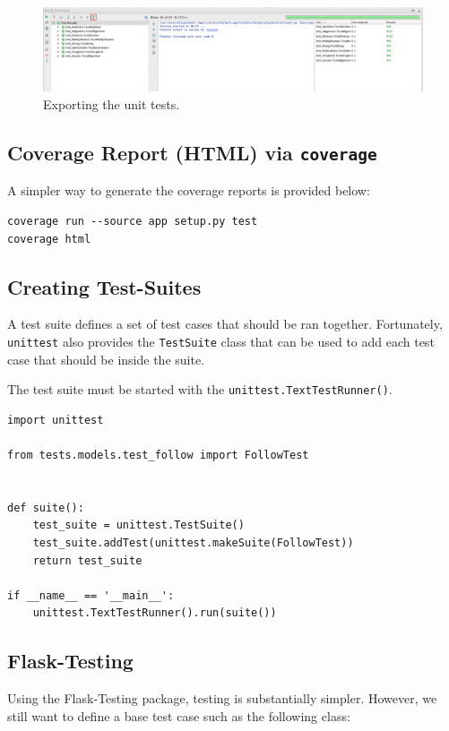 \documentclass[../main/main.tex]{subfiles}
\begin{document}
\begin{figure}[H]
  \centering
  \includegraphics[width=0.8\linewidth]{../figures/export.png}
  \caption{Exporting the unit tests.}
  \label{fig:export}
\end{figure}

\subsection{Coverage Report (HTML) via \lstinline|coverage|}

A simpler way to generate the coverage reports is provided below: 

\begin{lstlisting}
coverage run --source app setup.py test
coverage html
\end{lstlisting}

\subsection{Creating Test-Suites}

A test suite defines a set of test cases that should be ran together.
Fortunately, \lstinline|unittest| also provides the \lstinline|TestSuite| class
that can be used to add each test case that should be inside the suite. 

The test suite must be started with the \lstinline|unittest.TextTestRunner()|. 

\begin{lstlisting}
import unittest

from tests.models.test_follow import FollowTest


def suite():
    test_suite = unittest.TestSuite()
    test_suite.addTest(unittest.makeSuite(FollowTest))
    return test_suite

if __name__ == '__main__':
    unittest.TextTestRunner().run(suite())
\end{lstlisting}

\subsection{Flask-Testing}

Using the Flask-Testing package, testing is substantially simpler. However, we
still want to define a base test case such as the following class:
\end{document}
